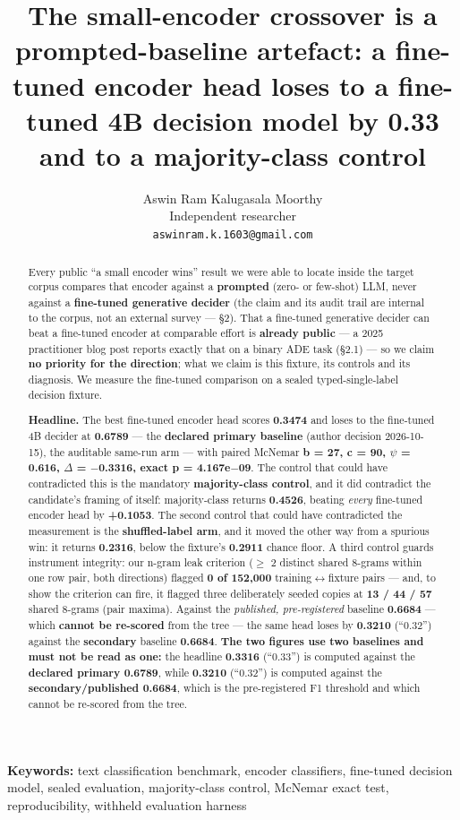 \documentclass[11pt,a4paper]{article}
\title{The small-encoder crossover is a prompted-baseline artefact: a fine-tuned encoder head loses to a fine-tuned 4B decision model by 0.33 and to a majority-class control}
\author{Aswin Ram Kalugasala Moorthy\\ Independent researcher\\ \texttt{aswinram.k.1603@gmail.com}}
\date{}   %
\begin{document}
\maketitle
\noindent\textbf{Keywords:} text classification benchmark, encoder classifiers, fine-tuned decision model, sealed evaluation, majority-class control, McNemar exact test, reproducibility, withheld evaluation harness

\begin{abstract}
Every public ``a small encoder wins'' result we were able to locate inside the target corpus compares that encoder against a \textbf{prompted} (zero- or few-shot) LLM, never against a \textbf{fine-tuned generative decider} (the claim and its audit trail are internal to the corpus, not an external survey --- \S2). That a fine-tuned generative decider can beat a fine-tuned encoder at comparable effort is \textbf{already public} --- a 2025 practitioner blog post reports exactly that on a binary ADE task (\S2.1) --- so we claim \textbf{no priority for the direction}; what we claim is this fixture, its controls and its diagnosis. We measure the fine-tuned comparison on a sealed typed-single-label decision fixture.

\textbf{Headline.} The best fine-tuned encoder head scores \textbf{0.3474} and loses to the fine-tuned 4B decider at \textbf{0.6789} --- the \textbf{declared primary baseline} (author decision 2026-10-15), the auditable same-run arm --- with paired McNemar \textbf{b = 27, c = 90, $\psi$ = 0.616, $\Delta$ = $-$0.3316, exact p = 4.167e$-$09}. The control that could have contradicted this is the mandatory \textbf{majority-class control}, and it did contradict the candidate's framing of itself: majority-class returns \textbf{0.4526}, beating \emph{every} fine-tuned encoder head by \textbf{+0.1053}. The second control that could have contradicted the measurement is the \textbf{shuffled-label arm}, and it moved the other way from a spurious win: it returns \textbf{0.2316}, below the fixture's \textbf{0.2911} chance floor. A third control guards instrument integrity: our n-gram leak criterion ($\ge$ 2 distinct shared 8-grams within one row pair, both directions) flagged \textbf{0 of 152,000} training$\leftrightarrow$fixture pairs --- and, to show the criterion can fire, it flagged three deliberately seeded copies at \textbf{13 / 44 / 57} shared 8-grams (pair maxima). Against the \emph{published, pre-registered} baseline \textbf{0.6684} --- which \textbf{cannot be re-scored} from the tree --- the same head loses by \textbf{0.3210} (``0.32'') against the \textbf{secondary} baseline \textbf{0.6684}. \textbf{The two figures use two baselines and must not be read as one:} the headline \textbf{0.3316} (``0.33'') is computed against the \textbf{declared primary 0.6789}, while \textbf{0.3210} (``0.32'') is computed against the \textbf{secondary/published 0.6684}, which is the pre-registered F1 threshold and which cannot be re-scored from the tree.


\end{abstract}
\end{document}
